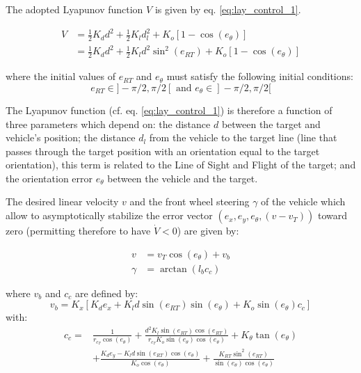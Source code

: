 The adopted Lyapunov function $V$ is given by eq. \ref{eq:lay_control_1}. 

\begin{equation}\label{eq:lay_control_1}
\begin{aligned}
V & =\frac{1}{2} K_d d^2+\frac{1}{2} K_l d_l^2+K_o\left[1-\cos \left(e_\theta\right)\right] \\
& =\frac{1}{2} K_d d^2+\frac{1}{2} K_l d^2 \sin ^2\left(e_{R T}\right)+K_o\left[1-\cos \left(e_\theta\right)\right]
\end{aligned}
\end{equation}


\noindent where the initial values of $e_{R T}$ and $e_\theta$ must satisfy the following initial conditions:
\begin{equation}
    e_{R T} \in ]-\pi / 2, \pi / 2\left[\text { and } e_\theta \in \right]-\pi / 2, \pi / 2[
\end{equation}

The Lyapunov function (cf. eq. \ref{eq:lay_control_1}) is therefore a function of three parameters which depend on: the distance $d$ between the target and vehicle's position; the distance $d_l$ from the vehicle to the target line (line that passes through the target position with an orientation equal to the target orientation), this term is related to the Line of Sight and Flight of the target; and the orientation error $e_\theta$ between the vehicle and the target.


The desired linear velocity $v$ and the front wheel steering $\gamma$ of the vehicle which allow to asymptotically stabilize the error vector $\left(e_x, e_y, e_\theta,\left(v-v_T\right)\right)$ toward zero (permitting therefore to have $\dot{V}<0$) are given by:

\begin{equation}
\begin{aligned}
v & =v_T \cos \left(e_\theta\right)+v_b \\
\gamma & =\arctan \left(l_b c_c\right)
\end{aligned}
\end{equation}

\noindent where $v_b$ and $c_c$ are defined by: 
\begin{equation}
v_b=K_x\left[K_d e_x+K_l d \sin \left(e_{R T}\right) \sin \left(e_\theta\right)+K_o \sin \left(e_\theta\right) c_c\right]
\end{equation}
with: 
\begin{equation}
\begin{aligned}
c_c= & \frac{1}{r_{c_T} \cos \left(e_\theta\right)}+\frac{d^2 K_l \sin \left(e_{R T}\right) \cos \left(e_{R T}\right)}{r_{c_T} K_o \sin \left(e_\theta\right) \cos \left(e_\theta\right)}+K_\theta \tan \left(e_\theta\right) \\
& +\frac{K_d e_y-K_l d \sin \left(e_{R T}\right) \cos \left(e_\theta\right)}{K_o \cos \left(e_\theta\right)}+\frac{K_{R T} \sin ^2\left(e_{R T}\right)}{\sin \left(e_\theta\right) \cos \left(e_\theta\right)}
\end{aligned}
\end{equation}

